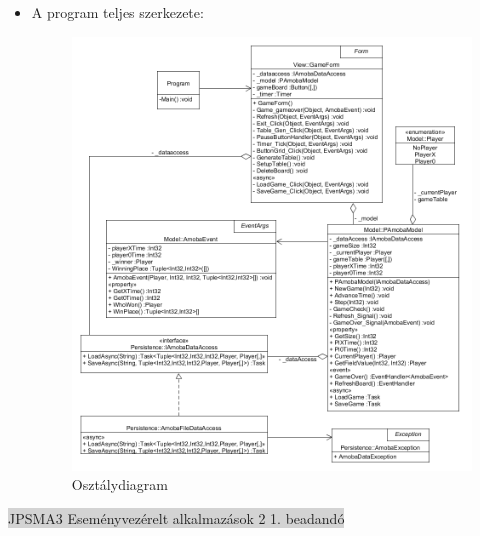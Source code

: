 \documentclass[11pt,a4paper]{article}
\begin{document}
\begin{itemize}
\begin{itemize}
		(\textbf{SetupTable}) privát metódusok végzik.
		\item A nézet továbbá rendelkezik egy időzítővel (\textbf{\_timer}), amely
		másodpercenként frissíti a játékosok megjelenített idejét.
	\end{itemize}
	\item A program teljes szerkezete:
	\begin{figure}[h]
		\centering
		\includegraphics[width=17cm]{UMLs/Class.png}
		\caption{Osztálydiagram}
	\end{figure}
\end{itemize}
\newpage
\thispagestyle{empty}
\begin{center}
\colorbox{lightgray}{{\large JPSMA3} \hspace{3cm} {\large Eseményvezérelt alkalmazások 2 1. beadandó} \hspace{5cm} \thepage}
\end{center}
\end{document}
